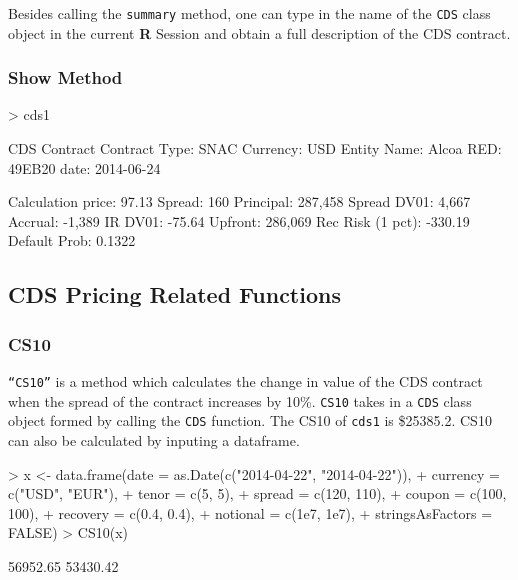 \documentclass{jss}
\begin{document}
Besides calling the \texttt{summary} method, one can type in the name of the \texttt{CDS} class object in the current \textbf{R} Session and obtain a full description of the CDS contract.

\subsubsection{Show Method}
\label{sec:showMethod}


\begin{Schunk}
\begin{Sinput}
> cds1
\end{Sinput}
\begin{Soutput}
CDS Contract 
Contract Type:                      SNAC   Currency:                         USD
Entity Name:                       Alcoa   RED:                           49EB20
date:                         2014-06-24

Calculation 
price:                             97.13   Spread:                           160
Principal:                       287,458   Spread DV01:                    4,667
Accrual:                          -1,389   IR DV01:                       -75.64
Upfront:                         286,069   Rec Risk (1 pct):             -330.19
Default Prob:                     0.1322
\end{Soutput}
\end{Schunk}

\subsection{CDS Pricing Related Functions}
\label{sec:CDSpricingFunctions}

\subsubsection{CS10}
\label{sec:CS10}

\texttt{``CS10''} is a method which calculates the change in value of the CDS contract when the spread of the contract increases by 10\%. \texttt{CS10} takes in a \texttt{CDS} class object formed by calling the \texttt{CDS} function. The CS10 of \texttt{cds1} is \$25385.2. CS10 can also be calculated by inputing a dataframe. 

\begin{Schunk}
\begin{Sinput}
> x <- data.frame(date = as.Date(c("2014-04-22", "2014-04-22")),
+                 currency = c("USD", "EUR"),
+                 tenor = c(5, 5),
+                 spread = c(120, 110),
+                 coupon = c(100, 100),
+                 recovery = c(0.4, 0.4),
+                 notional = c(1e7, 1e7),
+                 stringsAsFactors = FALSE)
> CS10(x)
\end{Sinput}
\begin{Soutput}
[1] 56952.65 53430.42
\end{Soutput}
\end{Schunk}
\end{document}
